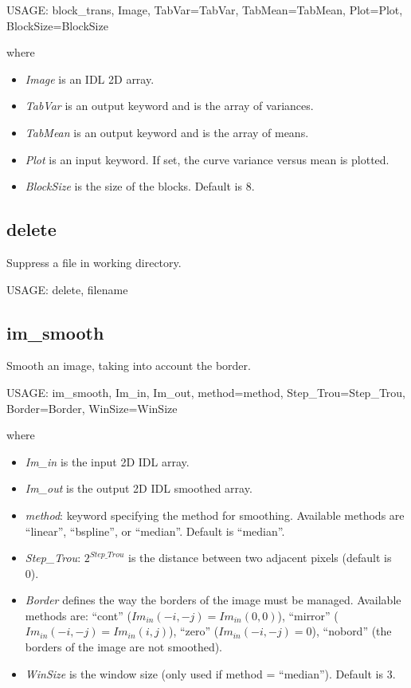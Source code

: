 {\bf
\begin{center}
     USAGE: block\_trans, Image, TabVar=TabVar, TabMean=TabMean,  Plot=Plot, BlockSize=BlockSize
\end{center}}
where
\begin{itemize}
\item {\em Image} is an IDL 2D array.
\item {\em TabVar} is an output keyword and is the array of variances.
\item {\em TabMean} is an output keyword and is the array of means.
\item {\em Plot} is an input keyword. If set, the curve variance versus
mean is plotted.
\item {\em BlockSize} is the size of the blocks. Default is 8.
\end{itemize}

\subsection{delete}
Suppress a file in working directory.
{\bf
\begin{center}
     USAGE: delete, filename
\end{center}}

\subsection{im\_smooth}
Smooth an image, taking into account the border.
{\bf
\begin{center}
     USAGE:  im\_smooth, Im\_in, Im\_out, method=method, Step\_Trou=Step\_Trou, Border=Border, WinSize=WinSize
\end{center}}
where
\begin{itemize}
\item {\em Im\_in} is the input 2D IDL array.
\item {\em Im\_out} is the output 2D IDL smoothed array.
\item {\em method}: keyword specifying the method for smoothing. 
Available methods are ``linear'', ``bspline'', or ``median''. Default is 
``median''.
\item {\em Step\_Trou}: $2^{Step\_Trou}$ is the  distance between 
two adjacent 
pixels (default is 0).
\item {\em Border} defines the way  the borders of the image must be managed.
Available methods are: ``cont'' ($Im_{in}(-i,-j) = Im_{in}(0,0)$), ``mirror''  
($Im_{in}(-i,-j) = Im_{in}(i,j)$), ``zero'' ($Im_{in}(-i,-j) = 0$), ``nobord'' (the
borders of the image are not 
smoothed).
\item {\em WinSize} is the window size (only used if method = 
``median''). Default is 3.
\end{itemize}

